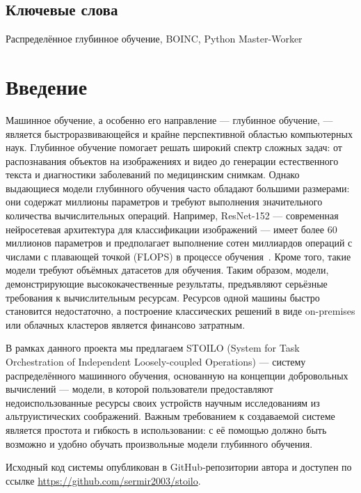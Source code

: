 \documentclass[a4paper,12pt]{extarticle}
\begin{document}

\subsection*{Ключевые слова}
Распределённое глубинное обучение, BOINC, Python Master-Worker

\clearpage
{
	\hypersetup{linkcolor=black}
	\tableofcontents
}
\clearpage

\section{Введение}

Машинное обучение, а особенно его направление — глубинное обучение, — является быстроразвивающейся и крайне перспективной областью компьютерных наук.
Глубинное обучение помогает решать широкий спектр сложных задач: от распознавания объектов на изображениях и видео до генерации естественного текста и диагностики заболеваний по медицинским снимкам.
Однако выдающиеся модели глубинного обучения часто обладают большими размерами: они содержат миллионы параметров и требуют выполнения значительного количества вычислительных операций.
Например, ResNet-152 — современная нейросетевая архитектура для классификации изображений — имеет более 60 миллионов параметров и предполагает выполнение сотен миллиардов операций с числами с плавающей точкой (FLOPS) в процессе обучения~\cite{he2015deepresidual}.
Кроме того, такие модели требуют объёмных датасетов для обучения.
Таким образом, модели, демонстрирующие высококачественные результаты, предъявляют серьёзные требования к вычислительным ресурсам.
Ресурсов одной машины быстро становится недостаточно, а построение классических решений в виде on-premises или облачных кластеров является финансово затратным.

В рамках данного проекта мы предлагаем STOILO (System for Task Orchestration of Independent Loosely-coupled Operations) — систему распределённого машинного обучения, основанную на концепции добровольных вычислений — модели, в которой пользователи предоставляют недоиспользованные ресурсы своих устройств научным исследованиям из альтруистических соображений.
Важным требованием к создаваемой системе является простота и гибкость в использовании: с её помощью должно быть возможно и удобно обучать произвольные модели глубинного обучения.

Исходный код системы опубликован в GitHub-репозитории автора и доступен по ссылке \url{https://github.com/sermir2003/stoilo}.
\end{document}

